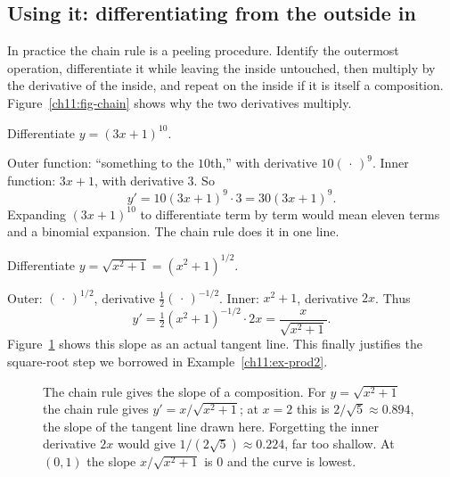 \subsection{Using it: differentiating from the outside in}

In practice the chain rule is a peeling procedure. Identify the outermost operation,
differentiate it while leaving the inside untouched, then multiply by the derivative of
the inside, and repeat on the inside if it is itself a composition.
Figure~\ref{ch11:fig-chain} shows why the two derivatives multiply.

\begin{example}\label{ch11:ex-chain1}
Differentiate $y = (3x+1)^{10}$.

Outer function: ``something to the $10$th,'' with derivative $10(\,\cdot\,)^9$. Inner
function: $3x+1$, with derivative $3$. So
\[
  y' = 10(3x+1)^{9}\cdot 3 = 30(3x+1)^{9}.
\]
Expanding $(3x+1)^{10}$ to differentiate term by term would mean eleven terms and a
binomial expansion. The chain rule does it in one line.
\end{example}

\begin{example}\label{ch11:ex-chain2}
Differentiate $y = \sqrt{x^2+1} = (x^2+1)^{1/2}$.

Outer: $(\,\cdot\,)^{1/2}$, derivative $\tfrac12(\,\cdot\,)^{-1/2}$. Inner: $x^2+1$,
derivative $2x$. Thus
\[
  y' = \tfrac12 (x^2+1)^{-1/2}\cdot 2x = \frac{x}{\sqrt{x^2+1}} .
\]
Figure~\ref{ch11:fig-chain-graph} shows this slope as an actual tangent line.
This finally justifies the square-root step we borrowed in
Example~\ref{ch11:ex-prod2}.
\end{example}

\begin{figure}[H]
\centering
{}
\caption{The chain rule gives the slope of a composition. For $y=\sqrt{x^2+1}$ the
chain rule gives $y'=x/\sqrt{x^2+1}$; at $x=2$ this is $2/\sqrt5\approx 0.894$, the slope
of the tangent line drawn here. Forgetting the inner derivative $2x$ would give
$1/(2\sqrt5)\approx 0.224$, far too shallow. At $(0,1)$ the slope $x/\sqrt{x^2+1}$ is $0$
and the curve is lowest.}
\label{ch11:fig-chain-graph}
\end{figure}

